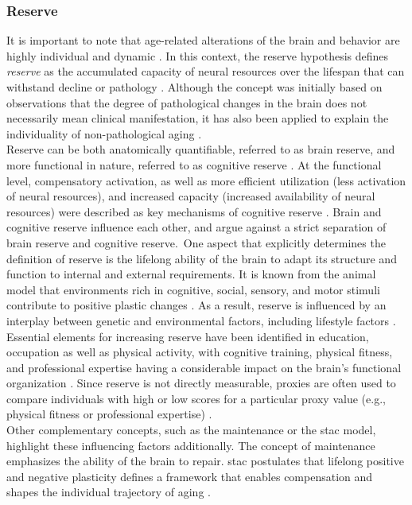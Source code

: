 \subsubsection{Reserve}
\label{theory:aging:reserve}
It is important to note that age-related alterations of the brain and behavior are highly individual and dynamic \cite{Smith2020,Koen2019,Douw2014}. In this context, the reserve hypothesis defines \textit{reserve} as the accumulated capacity of neural resources over the lifespan that can withstand decline or pathology \cite{Cabeza2018, Stern2009}. Although the concept was initially based on observations that the degree of pathological changes in the brain does not necessarily mean clinical manifestation, it has also been applied to explain the individuality of non-pathological aging \cite{Esiri2001,Cabeza2018,Stern2009}.\\
Reserve can be both anatomically quantifiable, referred to as brain reserve, and more functional in nature, referred to as cognitive reserve \cite{Stern2009}. At the functional level, compensatory activation, as well as more efficient utilization (less activation of neural resources), and increased capacity (increased availability of neural resources) were described as key mechanisms of cognitive reserve \cite{Stern2004,Stern2009}. Brain and cognitive reserve influence each other, and \citeauthor{Cabeza2018} \cite{Cabeza2018} argue against a strict separation of brain reserve and cognitive reserve.\
One aspect that explicitly determines the definition of reserve is the lifelong ability of the brain to adapt its structure and function to internal and external requirements. It is known from the animal model that environments rich in cognitive, social, sensory, and motor stimuli contribute to positive plastic changes \cite{Fabel2009}. As a result, reserve is influenced by an interplay between genetic and environmental factors, including lifestyle factors \cite{Cabeza2018}. Essential elements for increasing reserve have been identified in education, occupation as well as physical activity, with cognitive training, physical fitness, and professional expertise having a considerable impact on the brain's functional organization \cite{Vieluf2018,Voss2016,Soldan2021}. Since reserve is not directly measurable, proxies are often used to compare individuals with high or low scores for a particular proxy value (e.g., physical fitness or professional expertise) \cite{Cabeza2018}.\\
Other complementary concepts, such as the maintenance or the \gls{stac} model, highlight these influencing factors additionally. The concept of maintenance emphasizes the ability of the brain to repair. \Gls{stac} postulates that lifelong positive and negative plasticity defines a framework that enables compensation and shapes the individual trajectory of aging \cite{Reuter-Lorenz2014}. 

